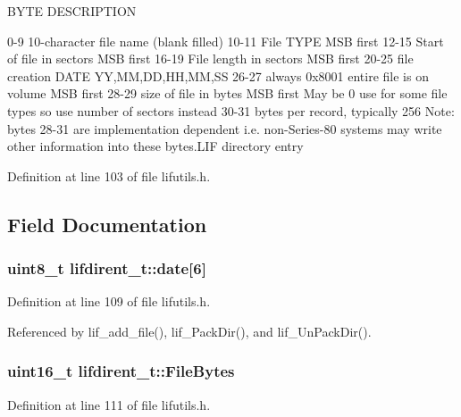 B\+Y\+TE D\+E\+S\+C\+R\+I\+P\+T\+I\+ON 

 0-\/9 10-\/character file name (blank filled) 10-\/11 File T\+Y\+PE M\+SB first 12-\/15 Start of file in sectors M\+SB first 16-\/19 File length in sectors M\+SB first 20-\/25 file creation D\+A\+TE YY,MM,DD,HH,MM,SS 26-\/27 always 0x8001 entire file is on volume M\+SB first 28-\/29 size of file in bytes M\+SB first May be 0 use for some file types so use number of sectors instead 30-\/31 bytes per record, typically 256 Note\+: bytes 28-\/31 are implementation dependent i.\+e. non-\/\+Series-\/80 systems may write other information into these bytes.\+L\+IF directory entry 

Definition at line 103 of file lifutils.\+h.



\subsection{Field Documentation}
\subsubsection[{\texorpdfstring{date}{date}}]{\setlength{\rightskip}{0pt plus 5cm}uint8\+\_\+t lifdirent\+\_\+t\+::date\mbox{[}6\mbox{]}}\hypertarget{structlifdirent__t_a6ef6cc281858e9d0de62c6a9ab5b432e}{}\label{structlifdirent__t_a6ef6cc281858e9d0de62c6a9ab5b432e}


Definition at line 109 of file lifutils.\+h.



Referenced by lif\+\_\+add\+\_\+file(), lif\+\_\+\+Pack\+Dir(), and lif\+\_\+\+Un\+Pack\+Dir().

\subsubsection[{\texorpdfstring{File\+Bytes}{FileBytes}}]{\setlength{\rightskip}{0pt plus 5cm}uint16\+\_\+t lifdirent\+\_\+t\+::\+File\+Bytes}\hypertarget{structlifdirent__t_a66e5f440e3a192df59c623faa2d01dbd}{}\label{structlifdirent__t_a66e5f440e3a192df59c623faa2d01dbd}


Definition at line 111 of file lifutils.\+h.



